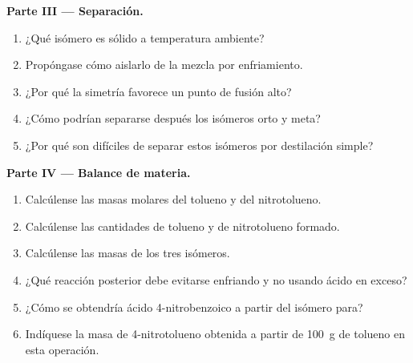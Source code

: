\begin{problem}
\medskip
\noindent\textbf{Parte III --- Separación.}
\begin{enumerate}[resume]
  \item ¿Qué isómero es sólido a temperatura ambiente?
  \item Propóngase cómo aislarlo de la mezcla por enfriamiento.
  \item ¿Por qué la simetría favorece un punto de fusión alto?
  \item ¿Cómo podrían separarse después los isómeros orto y meta?
  \item ¿Por qué son difíciles de separar estos isómeros por destilación simple?
\end{enumerate}

\medskip
\noindent\textbf{Parte IV --- Balance de materia.}
\begin{enumerate}[resume]
  \item Calcúlense las masas molares del tolueno y del nitrotolueno.
  \item Calcúlense las cantidades de tolueno y de nitrotolueno formado.
  \item Calcúlense las masas de los tres isómeros.
  \item ¿Qué reacción posterior debe evitarse enfriando y no usando ácido en exceso?
  \item ¿Cómo se obtendría ácido 4-nitrobenzoico a partir del isómero para?
  \item Indíquese la masa de 4-nitrotolueno obtenida a partir de \qty{100}{g} de tolueno en esta operación.
\end{enumerate}
\end{problem}

